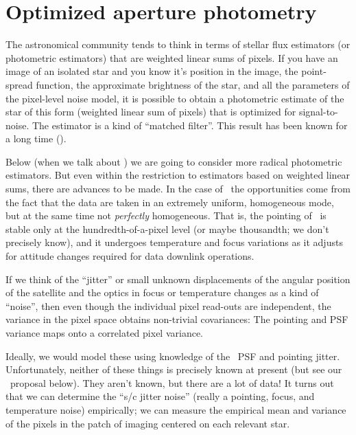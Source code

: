 \documentclass[letterpaper,12pt,preprint]{hack_aastex}
\begin{document}
\section{Optimized aperture photometry}

The astronomical community tends to think in terms of stellar flux estimators
(or photometric estimators) that are weighted linear sums of pixels.
If you have an image of an isolated star and you know it's position in the
image, the point-spread function, the approximate brightness of the star, and
all the parameters of the pixel-level noise model, it is possible to obtain a
photometric estimate of the star of this form (weighted linear sum of pixels)
that is optimized for signal-to-noise.
The estimator is a kind of ``matched filter''.
This result has been known for a long time (\citealt{matched-filter}).

Below (when we talk about \kpsf) we are going to consider more radical
photometric estimators.
But even within the restriction to estimators based on weighted linear sums,
there are advances to be made.
In the case of \Kepler\ the opportunities come from the fact that the data
are taken in an extremely uniform, homogeneous mode, but at the same time not
\emph{perfectly} homogeneous.
That is, the pointing of \Kepler\ is stable only at the hundredth-of-a-pixel
level (or maybe thousandth; we don't precisely know), and it undergoes
temperature and focus variations as it adjusts for attitude changes required
for data downlink operations.

If we think of the ``jitter'' or small unknown displacements of the angular
position of the satellite and the optics in focus or temperature changes as a
kind of ``noise'', then even though the individual pixel read-outs are
independent, the variance in the pixel space obtains non-trivial covariances:
The pointing and PSF variance maps onto a correlated pixel variance.

Ideally, we would model these using knowledge of the \Kepler\ PSF and
pointing jitter.
Unfortunately, neither of these things is precisely known at present (but see
our \kpsf\ proposal below).
They aren't known, but there are a lot of data!
It turns out that we can determine the ``s/c jitter noise'' (really a pointing,
focus, and temperature noise) empirically;
we can measure the empirical mean and variance of the pixels in the patch of
imaging centered on each relevant star.
\end{document}
